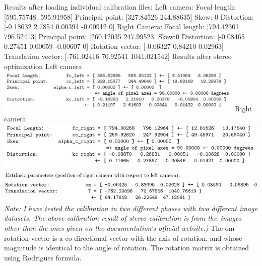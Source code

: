 \documentclass[a4paper, 12pt]{report}
\begin{document}
Results after loading individual calibration files: \newline  \newline 
Left camera: \newline 
Focal length: [595.75748. 595.91958]
Principal point: [327.84526 244.88635]
Skew: 0
Distortion: [-0.18032 2.7854 0.00391 -0.00912 0]
\newline 
Right Camera: \newline 
Focal length: [794.42301 796.52413]
Principal point: [260.12035 247.99523]
Skew:0
Distortion: [-0.08465 0.27451 0.00059 -0.00607 0]
\newline 
Rotation vector: [-0.06327 0.84210 0.02963] \newline 
Translation vector: [-761.02416 70.92541 1041.021542]
\newline \newline 
Results after stereo optimization \newline 
Left camera \newline 
\includegraphics[width=0.9\textwidth]{resources/image/44.jpg} 
\newline 
Right camera \newline 
\includegraphics[width=1.0\textwidth]{resources/image/45.jpg} \newline 
\includegraphics[width=1.0\textwidth]{resources/image/35.jpg} 
\newline 
\textit{Note: I have tested the calibration in two different phases with two different image datasets. The above calibration result of stereo calibration is from the images other than the ones given on the documentation's official website.)} \newline 
The om rotation vector is a co-directional vector with the axis of rotation, and whose magnitude is identical to the angle of rotation. The rotation matrix is obtained using Rodrigues formula. \newline 
\end{document}
